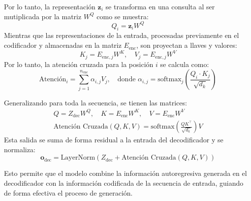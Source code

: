\documentclass[12pt,letterpaper]{article}
\begin{document}
Por lo tanto, la representación $\textbf{z}_i$ se transforma en una consulta al ser mutiplicada por la matriz $W^Q$ como se muestra:
\begin{equation}
Q_i = \textbf{z}_i W^Q
\end{equation}
Mientras que las representaciones de la entrada, procesadas previamente en el codificador y almacenadas en la matriz $E_{\text{enc}}$, son proyectan a llaves y valores:
\begin{equation}
K_j = E_{\text{enc},j} W^K, \quad V_j = E_{\text{enc},j} W^V
\end{equation}
Por lo tanto, la atención cruzada para la posición $i$ se calcula como:
\begin{equation}
\text{Atención}_i = \sum_{j=1}^{n_{\text{enc}}} \alpha_{i,j} V_j, \quad \text{donde } \alpha_{i,j} = \text{softmax}_j\left( \frac{Q_i \cdot K_j}{\sqrt{d_k}} \right)
\end{equation}

Generalizando para toda la secuencia, se tienen las matrices:
\begin{gather}
Q = Z_{\text{dec}} W^Q, \quad K = E_{\text{enc}} W^K, \quad V = E_{\text{enc}} W^V\\
\text{Atención Cruzada}(Q, K, V) = \text{softmax}\left( \frac{Q K^\top}{\sqrt{d_k}} \right)V
\end{gather}
Esta salida se suma de forma residual a la entrada del decodificador y se normaliza:
\begin{equation}
\textbf{o}_{\text{dec}} = \text{LayerNorm}(Z_{\text{dec}} + \text{Atención Cruzada}(Q, K, V))
\end{equation}

Esto permite que el modelo combine la información autoregresiva generada en el decodificador con la información codificada de la secuencia de entrada, guiando de forma efectiva el proceso de generación.
\end{document}
